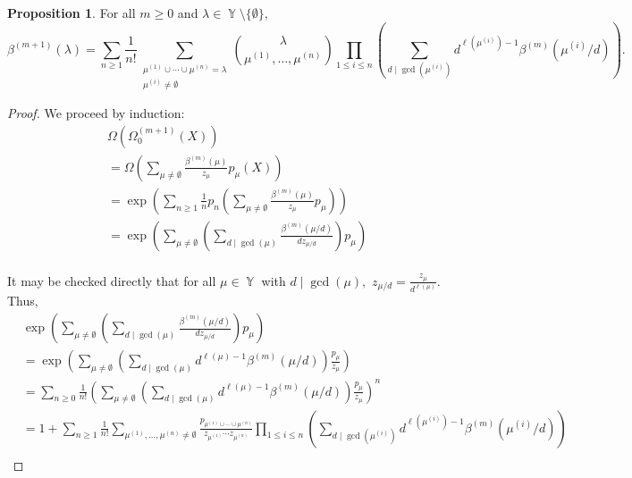 \documentclass[12pt,reqno]{amsart}
\theoremstyle{definition}
\newtheorem{prop}[thm]{Proposition}
\DeclareMathOperator{\Par}{\mathbb{Y}}
\begin{document}
\begin{prop}\label{power sum recursion prop}
For all $m \geq 0$ and $\lambda \in \Par \setminus \{\emptyset \},$
    $$\beta^{(m+1)}(\lambda) = \sum_{n \geq 1} \frac{1}{n!} \sum_{\substack{\mu^{(1)}\cup\cdots \cup \mu^{(n)} = \lambda \\ \mu^{(i)} \neq \emptyset}} \binom{\lambda}{\mu^{(1)},\ldots,\mu^{(n)}}\prod_{1\leq i\leq n } \left( \sum_{d\mid \gcd(\mu^{(i)})} d^{\ell(\mu^{(i)})-1} \beta^{(m)}(\mu^{(i)}/d) \right).$$
\end{prop}
\begin{proof}
We proceed by induction:
    \begin{align*}
        & \Omega\left( \Omega_0^{(m+1)}(X)  \right) \\
        &=\Omega \left( \sum_{\mu \neq \emptyset} \frac{\beta^{(m)}(\mu)}{z_{\mu}} p_{\mu}(X) \right) \\
        &= \exp\left( \sum_{n \geq 1} \frac{1}{n} p_n \left( \sum_{\mu\neq \emptyset} \frac{\beta^{(m)}(\mu)}{z_{\mu}} p_{\mu} \right) \right)  \\
        &= \exp \left( \sum_{\mu \neq \emptyset} \left( \sum_{d \mid \gcd(\mu)} \frac{\beta^{(m)}(\mu/d)}{dz_{\mu/d}} \right) p_{\mu} \right)\\
    \end{align*}

    It may be checked directly that for all $\mu \in \Par$ with $d \mid \gcd(\mu),$
    $z_{\mu/d} = \frac{z_{\mu}}{d^{\ell(\mu)}}.$ Thus,
    \begin{align*}
    & \exp \left( \sum_{\mu \neq \emptyset} \left( \sum_{d \mid \gcd(\mu)} \frac{\beta^{(m)}(\mu/d)}{dz_{\mu/d}} \right) p_{\mu} \right) \\
        &= \exp \left( \sum_{\mu \neq \emptyset} \left( \sum_{d \mid \gcd(\mu)}  d^{\ell(\mu)-1}\beta^{(m)}(\mu/d)\right) \frac{p_{\mu}}{z_{\mu}} \right) \\
        &= \sum_{n \geq 0} \frac{1}{n!} \left( \sum_{\mu \neq \emptyset} \left( \sum_{d \mid \gcd(\mu)}  d^{\ell(\mu)-1}\beta^{(m)}(\mu/d)\right) \frac{p_{\mu}}{z_{\mu}} \right)^n\\
        &= 1 + \sum_{n \geq 1} \frac{1}{n!} \sum_{\mu^{(1)},\ldots,\mu^{(n)}\neq \emptyset } \frac{p_{\mu^{(1)}\cup\cdots \cup \mu^{(n)}}}{z_{\mu^{(1)}}\cdots z_{\mu^{(n)}}} \prod_{1\leq i\leq n } \left( \sum_{d\mid \gcd(\mu^{(i)})} d^{\ell(\mu^{(i)})-1} \beta^{(m)}(\mu^{(i)}/d) \right) \\
    \end{align*}


\end{proof}
\end{document}
